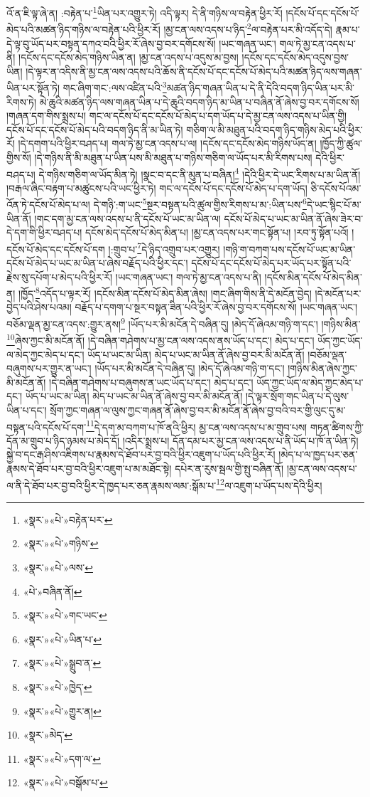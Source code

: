 འོ་ན་ཇི་ལྟ་ཞེ་ན། :བརྟེན་པ་\footnote{«སྣར་»«པེ་»བརྟེན་པར་}ཡིན་པར་འགྱུར་ཏེ། འདི་ལྟར། དེ་ནི་གཉིས་ལ་བརྟེན་ཕྱིར་རོ། །དངོས་པོ་དང་དངོས་པོ་མེད་པའི་མཚན་ཉིད་གཉིས་ལ་བརྟེན་པའི་ཕྱིར་རོ། །མྱ་ངན་ལས་འདས་པ་ཉིད་\footnote{«སྣར་»«པེ་»གཉིས་}ལ་བརྟེན་པར་མི་འདོད་དེ། རྣམ་པ་དེ་ལྟ་བུ་ཡོད་པར་བསྟན་དཀའ་བའི་ཕྱིར་རོ་ཞེས་བྱ་བར་དགོངས་སོ། །ཡང་གཞན་ཡང་། གལ་ཏེ་མྱ་ངན་འདས་པ་ནི། །དངོས་དང་དངོས་མེད་གཉིས་ཡིན་ན། །མྱ་ངན་འདས་པ་འདུས་མ་བྱས། །དངོས་དང་དངོས་མེད་འདུས་བྱས་ཡིན། །དེ་ལྟར་ན་འདིས་ནི་མྱ་ངན་ལས་འདས་པའི་ཆོས་ནི་དངོས་པོ་དང་དངོས་པོ་མེད་པའི་མཚན་ཉིད་ལས་གཞན་ཡིན་པར་སྟོན་ཏེ། གང་ཞིག་གང་:ལས་འཛིན་པའི་\footnote{«སྣར་»«པེ་»ལས་}མཚན་ཉིད་གཞན་ཡིན་པ་དེ་ནི་དེའི་བདག་ཉིད་ཡིན་པར་མི་རིགས་ཏེ། མེ་ཆུའི་མཚན་ཉིད་ལས་གཞན་ཡིན་པ་དེ་ཆུའི་བདག་ཉིད་མ་ཡིན་པ་བཞིན་ནོ་ཞེས་བྱ་བར་དགོངས་སོ། །གཞན་དག་གིས་སྨྲས་པ། གང་ལ་དངོས་པོ་དང་དངོས་པོ་མེད་པ་དག་ཡོད་པ་དེ་མྱ་ངན་ལས་འདས་པ་ཡིན་གྱི། དངོས་པོ་དང་དངོས་པོ་མེད་པའི་བདག་ཉིད་ནི་མ་ཡིན་ཏེ། གཅིག་ལ་མི་མཐུན་པའི་བདག་ཉིད་གཉིས་མེད་པའི་ཕྱིར་རོ། །དེ་དགག་པའི་ཕྱིར་བཤད་པ། གལ་ཏེ་མྱ་ངན་འདས་པ་ལ། །དངོས་དང་དངོས་མེད་གཉིས་ཡོད་ན། །ཁྱོད་ཀྱི་ཚུལ་གྱིས་སོ། །དེ་གཉིས་ནི་མི་མཐུན་པ་ཡིན་པས་མི་མཐུན་པ་གཉིས་གཅིག་ལ་ཡོད་པར་མི་རིགས་པས། དེའི་ཕྱིར་བཤད་པ། དེ་གཉིས་གཅིག་ལ་ཡོད་མིན་ཏེ། །སྣང་བ་དང་ནི་མུན་པ་བཞིན།\footnote{«པེ་»བཞིན་ནོ།} །དེའི་ཕྱིར་དེ་ཡང་རིགས་པ་མ་ཡིན་ནོ། །བརྒལ་ཞིང་བརྟག་པ་མཚུངས་པའི་ཡང་ཕྱིར་ཏེ། གང་ལ་དངོས་པོ་དང་དངོས་པོ་མེད་པ་དག་ཡོད། ཅི་དངོས་པོའམ་འོན་ཏེ་དངོས་པོ་མེད་པ་ལ། དེ་གཉི་:ག་ཡང་\footnote{«སྣར་»«པེ་»གང་ཡང་}སྔར་བསྟན་པའི་ཚུལ་གྱིས་རིགས་པ་མ་:ཡིན་པས་\footnote{«སྣར་»«པེ་»ཡིན་པ་}དེ་ཡང་སྙིང་པོ་མ་ཡིན་ནོ། །གང་དག་མྱ་ངན་ལས་འདས་པ་ནི་དངོས་པོ་ཡང་མ་ཡིན་ལ། དངོས་པོ་མེད་པ་ཡང་མ་ཡིན་ནོ་ཞེས་ཟེར་བ་དེ་དག་གི་ཕྱིར་བཤད་པ། དངོས་མེད་དངོས་པོ་མེད་མིན་པ། །མྱ་ངན་འདས་པར་གང་སྟོན་པ། །རབ་ཏུ་སྟོན་པའོ། །དངོས་པོ་མེད་དང་དངོས་པོ་དག །:གྲུབ་པ་\footnote{«སྣར་»«པེ་»སྒྲུབ་ན་}དེ་ཉིད་འགྲུབ་པར་འགྱུར། །གཉི་ག་བཀག་པས་དངོས་པོ་ཡང་མ་ཡིན་དངོས་པོ་མེད་པ་ཡང་མ་ཡིན་པ་ཞེས་བརྗོད་པའི་ཕྱིར་དང་། དངོས་པོ་དང་དངོས་པོ་མེད་པར་ཡོད་པར་སྟོན་པའི་རྗེས་སུ་དཔོག་པ་མེད་པའི་ཕྱིར་རོ། །ཡང་གཞན་ཡང་། གལ་ཏེ་མྱ་ངན་འདས་པ་ནི། །དངོས་མིན་དངོས་པོ་མེད་མིན་ན། །ཁྱོད་\footnote{«སྣར་»«པེ་»ཁྱེད་}འདོད་པ་ལྟར་རོ། །དངོས་མིན་དངོས་པོ་མེད་མིན་ཞེས། །གང་ཞིག་གིས་ནི་དེ་མངོན་བྱེད། །དེ་མངོན་པར་བྱེད་པའི་ཤེས་པའམ། བརྗོད་པ་དགག་པ་སྔར་བསྟན་ཟིན་པའི་ཕྱིར་རོ་ཞེས་བྱ་བར་དགོངས་སོ། །ཡང་གཞན་ཡང་། བཅོམ་ལྡན་མྱ་ངན་འདས་:གྱུར་ནས།\footnote{«སྣར་»«པེ་»གྱུར་ན།} །ཡོད་པར་མི་མངོན་དེ་བཞིན་དུ། །མེད་དོ་ཞེའམ་གཉི་ག་དང་། །གཉིས་མིན་\footnote{«སྣར་»མེད་}ཞེས་ཀྱང་མི་མངོན་ནོ། །དེ་བཞིན་གཤེགས་པ་མྱ་ངན་ལས་འདས་ནས་ཡོད་པ་དང་། མེད་པ་དང་། ཡོད་ཀྱང་ཡོད་ལ་མེད་ཀྱང་མེད་པ་དང་། ཡོད་པ་ཡང་མ་ཡིན། མེད་པ་ཡང་མ་ཡིན་ནོ་ཞེས་བྱ་བར་མི་མངོན་ནོ། །བཅོམ་ལྡན་བཞུགས་པར་གྱུར་ན་ཡང་། །ཡོད་པར་མི་མངོན་དེ་བཞིན་དུ། །མེད་དོ་ཞེའམ་གཉི་ག་དང་། །གཉིས་མིན་ཞེས་ཀྱང་མི་མངོན་ནོ། །དེ་བཞིན་གཤེགས་པ་བཞུགས་ན་ཡང་ཡོད་པ་དང་། མེད་པ་དང་། ཡོད་ཀྱང་ཡོད་ལ་མེད་ཀྱང་མེད་པ་དང་། ཡོད་པ་ཡང་མ་ཡིན། མེད་པ་ཡང་མ་ཡིན་ནོ་ཞེས་བྱ་བར་མི་མངོན་ནོ། །དེ་ལྟར་སྲོག་གང་ཡིན་པ་དེ་ལུས་ཡིན་པ་དང་། སྲོག་ཀྱང་གཞན་ལ་ལུས་ཀྱང་གཞན་ནོ་ཞེས་བྱ་བར་མི་མངོན་ནོ་ཞེས་བྱ་བའི་བར་གྱི་ལུང་དུ་མ་བསྟན་པའི་དངོས་པོ་དག་\footnote{«སྣར་»«པེ་»དག་ལ་}དེ་དག་མ་བཀག་པ་ཁོ་ནའི་ཕྱིར། མྱ་ངན་ལས་འདས་པ་མ་གྲུབ་པས། གཏན་ཚིགས་ཀྱི་དོན་མ་གྲུབ་པ་ཉིད་ཉམས་པ་མེད་དོ། །འདིར་སྨྲས་པ། དོན་དམ་པར་མྱ་ངན་ལས་འདས་པ་ནི་ཡོད་པ་ཁོ་ན་ཡིན་ཏེ། སྐྱེ་བ་དང་རྒ་ཤིས་འཇིགས་པ་རྣམས་དེ་ཐོབ་པར་བྱ་བའི་ཕྱིར་འཇུག་པ་ཡོད་པའི་ཕྱིར་རོ། །མེད་པ་ལ་ཁྱད་པར་ཅན་རྣམས་དེ་ཐོབ་པར་བྱ་བའི་ཕྱིར་འཇུག་པ་མ་མཐོང་སྟེ། དཔེར་ན་རུས་སྦལ་གྱི་སྤུ་བཞིན་ནོ། །མྱ་ངན་ལས་འདས་པ་ལ་ནི་དེ་ཐོབ་པར་བྱ་བའི་ཕྱིར་དེ་ཁྱད་པར་ཅན་རྣམས་ལམ་:སྒོམ་པ་\footnote{«སྣར་»«པེ་»བསྒོམ་པ་}ལ་འཇུག་པ་ཡོད་པས་དེའི་ཕྱིར། 